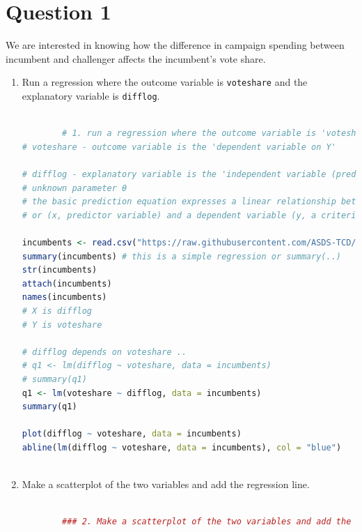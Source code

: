 \documentclass[12pt,letterpaper]{article}
\begin{document}
\section*{Question 1} %
\vspace{.25cm}
\noindent We are interested in knowing how the difference in campaign spending between incumbent and challenger affects the incumbent's vote share. 
	\begin{enumerate}
		\item Run a regression where the outcome variable is \texttt{voteshare} and the explanatory variable is \texttt{difflog}.	\vspace{5cm}
		
		
		\begin{lstlisting}[language=R]
		
		# 1. run a regression where the outcome variable is 'voteshare' and the explanatory variable is 'difflog'
# voteshare - outcome variable is the 'dependent variable on Y'

# difflog - explanatory variable is the 'independent variable (predictor variable) on X' 
# unknown parameter θ
# the basic prediction equation expresses a linear relationship between an independent variable 
# or (x, predictor variable) and a dependent variable (y, a criterian variable)

incumbents <- read.csv("https://raw.githubusercontent.com/ASDS-TCD/StatsI_Fall2021/main/datasets/incumbents_subset.csv")
summary(incumbents) # this is a simple regression or summary(..)
str(incumbents)
attach(incumbents)
names(incumbents)
# X is difflog
# Y is voteshare

# difflog depends on voteshare ..
# q1 <- lm(difflog ~ voteshare, data = incumbents)
# summary(q1)
q1 <- lm(voteshare ~ difflog, data = incumbents)
summary(q1)

plot(difflog ~ voteshare, data = incumbents)
abline(lm(difflog ~ voteshare, data = incumbents), col = "blue")
		
		\end{lstlisting}
		
		\item Make a scatterplot of the two variables and add the regression line. 	\vspace{7cm}
		
		\begin{lstlisting}[language=R]
		
		### 2. Make a scatterplot of the two variables and add the regression line ####


\end{lstlisting}
\end{enumerate}
\end{document}
